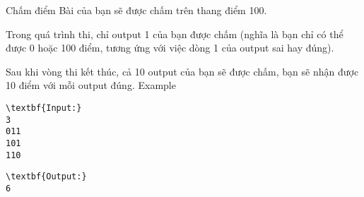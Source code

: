 Chấm điểm
Bài của bạn sẽ được chấm trên thang điểm 100.

Trong quá trình thi, chỉ output 1 của bạn được chấm (nghĩa là bạn chỉ có thể được 0 hoặc 100 điểm, tương ứng với việc dòng 1 của output sai hay đúng).

Sau khi vòng thi kết thúc, cả 10 output của bạn sẽ được chấm, bạn sẽ nhận được 10 điểm với mỗi output đúng.
Example
\begin{verbatim}
\textbf{Input:}
3
011
101
110\end{verbatim}
\begin{verbatim}
\textbf{Output:}
6
\end{verbatim}